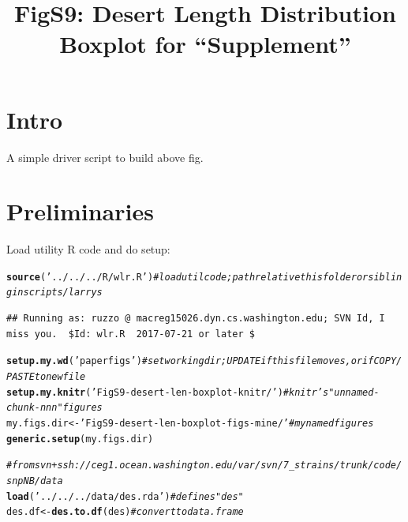 \documentclass{article}\usepackage[]{graphicx}\usepackage[]{color}
\makeatletter
\newcommand{\hlstr}[1]{\textcolor[rgb]{0.192,0.494,0.8}{#1}}%
\newcommand{\hlcom}[1]{\textcolor[rgb]{0.678,0.584,0.686}{\textit{#1}}}%
\newcommand{\hlstd}[1]{\textcolor[rgb]{0.345,0.345,0.345}{#1}}%
\newcommand{\hlkwb}[1]{\textcolor[rgb]{0.69,0.353,0.396}{#1}}%
\newcommand{\hlkwd}[1]{\textcolor[rgb]{0.737,0.353,0.396}{\textbf{#1}}}%
\newenvironment{kframe}{%
 \def\at@end@of@kframe{}%
 \ifinner\ifhmode%
  \def\at@end@of@kframe{\end{minipage}}%
  \begin{minipage}{\columnwidth}%
 \fi\fi%
 \def\FrameCommand##1{\hskip\@totalleftmargin \hskip-\fboxsep
 \colorbox{shadecolor}{##1}\hskip-\fboxsep
     \hskip-\linewidth \hskip-\@totalleftmargin \hskip\columnwidth}%
 \MakeFramed {\advance\hsize-\width
   \@totalleftmargin\z@ \linewidth\hsize
   \@setminipage}}%
 {\par\unskip\endMakeFramed%
 \at@end@of@kframe}
\newenvironment{knitrout}{}{} %
\makeatother
\begin{document}
\title{FigS9: Desert Length Distribution Boxplot for ``Supplement''}
\maketitle

\tableofcontents

\section{Intro}
A simple driver script to build above fig.  

\section{Preliminaries}
Load utility R code and do setup:

\begin{knitrout}\footnotesize
{}\color{fgcolor}\begin{kframe}
\begin{alltt}
\hlkwd{source}\hlstd{(}\hlstr{'../../../R/wlr.R'}\hlstd{)} \hlcom{# load util code; path relative this folder or sibling in scripts/larrys }
\end{alltt}
\begin{verbatim}
## Running as: ruzzo @ macreg15026.dyn.cs.washington.edu; SVN Id, I miss you.  $Id: wlr.R  2017-07-21 or later $
\end{verbatim}
\begin{alltt}
\hlkwd{setup.my.wd}\hlstd{(}\hlstr{'paperfigs'}\hlstd{)}   \hlcom{# set working dir; UPDATE if this file moves, or if COPY/PASTE to new file}
\hlkwd{setup.my.knitr}\hlstd{(}\hlstr{'FigS9-desert-len-boxplot-knitr/'}\hlstd{)} \hlcom{# knitr's "unnamed-chunk-nnn" figures}
\hlstd{my.figs.dir} \hlkwb{<-} \hlstr{'FigS9-desert-len-boxplot-figs-mine/'}  \hlcom{# my named figures}
\hlkwd{generic.setup}\hlstd{(my.figs.dir)}
\end{alltt}
\end{kframe}
\end{knitrout}
\begin{knitrout}\footnotesize
{}\color{fgcolor}\begin{kframe}
\begin{alltt}
\hlcom{# from svn+ssh://ceg1.ocean.washington.edu/var/svn/7_strains/trunk/code/snpNB/data}
\hlkwd{load}\hlstd{(}\hlstr{'../../../data/des.rda'}\hlstd{)} \hlcom{# defines "des"}
\hlstd{des.df} \hlkwb{<-} \hlkwd{des.to.df}\hlstd{(des)}      \hlcom{# convert to data.frame}
\end{alltt}
\end{kframe}
\end{knitrout}
\end{document}
